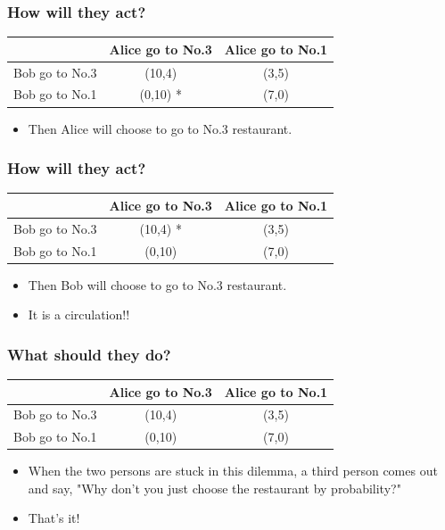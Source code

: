 \documentclass{beamer}
\begin{document}
\begin{frame}
\frametitle{How will they act?}
\begin{tabular}{|c|c|c|}
\hline
\hline
    & {\color{red}Alice} go to No.3 & {\color{red}Alice} go to No.1\\
\hline
{\color{blue}Bob} go to No.3 & ({\color{blue}10},{\color{red}4})& ({\color{blue}3},{\color{red}5}) \\
\hline
{\color{blue}Bob} go to No.1 & ({\color{blue}0},{\color{red}10}) {\color{green}*} & ({\color{blue}7},{\color{red}0})\\
\hline
\hline
\end{tabular}
\begin{itemize}
\item Then {\color{red}Alice} will choose to go to No.3 restaurant.
\end{itemize}
\end{frame}

\begin{frame}
\frametitle{How will they act?}
\begin{tabular}{|c|c|c|}
\hline
\hline
    & {\color{red}Alice} go to No.3 & {\color{red}Alice} go to No.1\\
\hline
{\color{blue}Bob} go to No.3 & ({\color{blue}10},{\color{red}4}) {\color{green}*}& ({\color{blue}3},{\color{red}5})\\
\hline
{\color{blue}Bob} go to No.1 & ({\color{blue}0},{\color{red}10}) & ({\color{blue}7},{\color{red}0})\\
\hline
\hline
\end{tabular}
\begin{itemize}
\item Then {\color{blue}Bob} will choose to go to No.3 restaurant.
\item {\Large It is a circulation!!}
\end{itemize}
\end{frame}

\begin{frame}
\frametitle{What should they do?}
\begin{tabular}{|c|c|c|}
\hline
\hline
    & {\color{red}Alice} go to No.3 & {\color{red}Alice} go to No.1\\
\hline
{\color{blue}Bob} go to No.3 & ({\color{blue}10},{\color{red}4}) & ({\color{blue}3},{\color{red}5})\\
\hline
{\color{blue}Bob} go to No.1 & ({\color{blue}0},{\color{red}10}) & ({\color{blue}7},{\color{red}0})\\
\hline
\hline
\end{tabular}
\begin{itemize}
\item When the two persons are stuck in this dilemma, a third person comes out and say, {\Large "Why don't you just choose the restaurant by probability?}"
\item That's it!
\end{itemize}
\end{frame}
\end{document}
